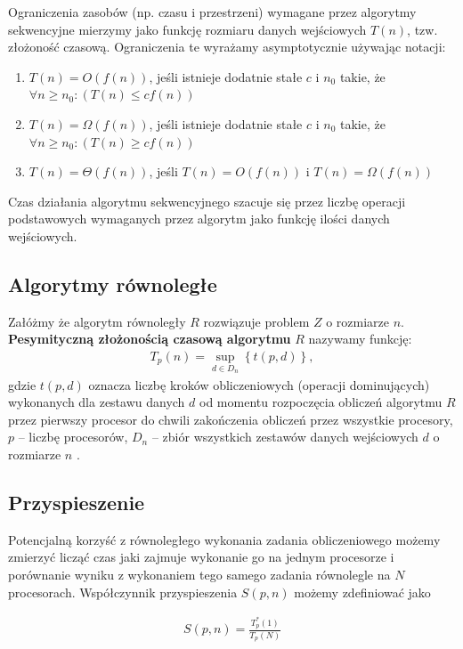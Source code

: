 \documentclass[a4paper,oneside,leqno,12pt]{book}
\theoremstyle{definition}
\theoremstyle{plain}
\theoremstyle{remark}
\begin{document}
Ograniczenia zasobów (np. czasu i przestrzeni) wymagane przez algorytmy sekwencyjne mierzymy jako funkcję rozmiaru danych wejściowych \(T(n)\), tzw. złożoność czasową. Ograniczenia te wyrażamy asymptotycznie używając notacji:

\begin{enumerate}
\item{\(T(n) = O(f(n))\), jeśli istnieje dodatnie stałe \(c\) i \(n_0\) takie, że \(\forall{n \geq n_0}: (T(n)\leq cf(n)) \)}
\item{\(T(n) = \Omega(f(n))\), jeśli istnieje dodatnie stałe \(c\) i \(n_0\) takie, że \(\forall{n \geq n_0}: (T(n)\geq cf(n)) \)}
\item{\(T(n) = \Theta(f(n))\), jeśli \(T(n)=O(f(n))\) i \(T(n)=\Omega(f(n))\)}
\end{enumerate}
Czas działania algorytmu sekwencyjnego szacuje się przez liczbę operacji podstawowych wymaganych przez algorytm jako funkcję ilości danych wejściowych.
\subsection{Algorytmy równoległe}

Załóżmy że algorytm równoległy \(R\) rozwiązuje problem \(Z\) o rozmiarze \(n\). \textbf{Pesymityczną złożonością czasową algorytmu} \(R\) nazywamy funkcję:\\

\begin{align}
T_{p}(n) = \sup_{d\in{D_n}}{\left\{t(p,d)\right\}},
\end{align}
gdzie \(t(p,d)\) oznacza liczbę kroków obliczeniowych (operacji dominujących) wykonanych dla zestawu danych \(d\) od momentu rozpoczęcia obliczeń algorytmu \(R\) przez pierwszy procesor do chwili zakończenia obliczeń przez wszystkie procesory, \(p\) -- liczbę procesorów, \(D_n\) -- zbiór wszystkich zestawów danych wejściowych \(d\) o rozmiarze \(n\) \cite{Czech}.


\subsection{Przyspieszenie}

Potencjalną korzyść z równoległego wykonania zadania obliczeniowego możemy zmierzyć licząć czas jaki zajmuje wykonanie go na jednym procesorze i porównanie wyniku z wykonaniem tego samego zadania równolegle na \(N\) procesorach. Współczynnik przyspieszenia \(S(p, n)\) możemy zdefiniować jako

\begin{align}\label{def:speedup_abs}
 S(p, n)=\frac{T^{*}_{p}(1)}{T_{p}(N)}
\end{align}
\end{document}
